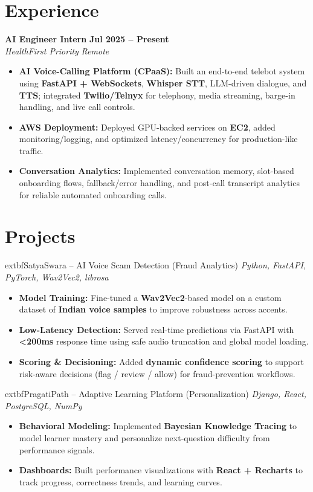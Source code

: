 \documentclass[10pt,a4paper]{article}
\newcommand{\entry}[4]{
  \textbf{#1} \hfill \textbf{#2} \\
  \textit{#3} \hfill \textit{#4}
}
\begin{document}
\section{Experience}
\entry{AI Engineer Intern}{Jul 2025 -- Present}{HealthFirst Priority}{Remote}
\begin{itemize}[leftmargin=*, nosep]
    \item \textbf{AI Voice-Calling Platform (CPaaS):} Built an end-to-end telebot system using \textbf{FastAPI + WebSockets}, \textbf{Whisper STT}, LLM-driven dialogue, and \textbf{TTS}; integrated \textbf{Twilio/Telnyx} for telephony, media streaming, barge-in handling, and live call controls.
    \item \textbf{AWS Deployment:} Deployed GPU-backed services on \textbf{EC2}, added monitoring/logging, and optimized latency/concurrency for production-like traffic.
    \item \textbf{Conversation Analytics:} Implemented conversation memory, slot-based onboarding flows, fallback/error handling, and post-call transcript analytics for reliable automated onboarding calls.
\end{itemize}

\section{Projects}

	extbf{SatyaSwara  – AI Voice Scam Detection (Fraud Analytics)} \hfill \textit{Python, FastAPI, PyTorch, Wav2Vec2, librosa}
\begin{itemize}[leftmargin=*, nosep]
    \item \textbf{Model Training:} Fine-tuned a \textbf{Wav2Vec2}-based model on a custom dataset of \textbf{Indian voice samples} to improve robustness across accents.
    \item \textbf{Low-Latency Detection:} Served real-time predictions via FastAPI with \textbf{<200ms} response time using safe audio truncation and global model loading.
    \item \textbf{Scoring \& Decisioning:} Added \textbf{dynamic confidence scoring} to support risk-aware decisions (flag / review / allow) for fraud-prevention workflows.
\end{itemize}
\vspace{2pt}

	extbf{PragatiPath – Adaptive Learning Platform (Personalization)} \hfill \textit{Django, React, PostgreSQL, NumPy}
\begin{itemize}[leftmargin=*, nosep]
    \item \textbf{Behavioral Modeling:} Implemented \textbf{Bayesian Knowledge Tracing} to model learner mastery and personalize next-question difficulty from performance signals.
    \item \textbf{Dashboards:} Built performance visualizations with \textbf{React + Recharts} to track progress, correctness trends, and learning curves.
\end{itemize}
\vspace{2pt}
\end{document}
